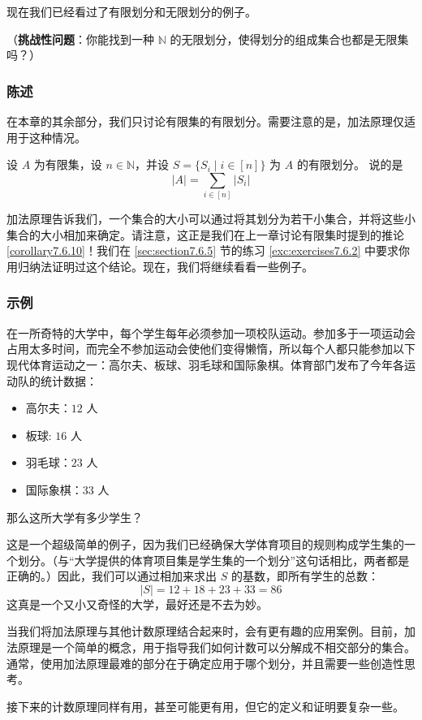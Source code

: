 现在我们已经看过了有限划分和无限划分的例子。

（\textbf{挑战性问题}：你能找到一种 $\mathbb{N}$ 的无限划分，使得划分的组成集合也都是无限集吗？）

\subsubsection*{陈述}

在本章的其余部分，我们只讨论有限集的有限划分。需要注意的是，加法原理仅适用于这种情况。

\begin{proposition}
    设 $A$ 为有限集，设 $n \in \mathbb{N}$，并设 $S = \{S_i \mid i \in [n]\}$ 为 $A$ 的有限划分。 说的是
    \[|A| = \sum_{i \in [n]} |S_i|\]
\end{proposition}

加法原理告诉我们，一个集合的大小可以通过将其划分为若干小集合，并将这些小集合的大小相加来确定。请注意，这正是我们在上一章讨论有限集时提到的推论 \ref{corollary7.6.10}！我们在 \ref{sec:section7.6.5} 节的练习 \ref{exc:exercises7.6.2} 中要求你用归纳法证明过这个结论。现在，我们将继续看看一些例子。

\subsubsection*{示例}

\begin{example}
    在一所奇特的大学中，每个学生每年必须参加一项校队运动。参加多于一项运动会占用太多时间，而完全不参加运动会使他们变得懒惰，所以每个人都只能参加以下现代体育运动之一：高尔夫、板球、羽毛球和国际象棋。体育部门发布了今年各运动队的统计数据：
    \begin{itemize}
        \item 高尔夫：$12$ 人
        \item 板球: $16$ 人
        \item 羽毛球：$23$ 人
        \item 国际象棋：$33$ 人
    \end{itemize}
    那么这所大学有多少学生？

    这是一个超级简单的例子，因为我们已经确保大学体育项目的规则构成学生集的一个划分。（与``大学提供的体育项目集是学生集的一个划分''这句话相比，两者都是正确的。）因此，我们可以通过相加来求出 $S$ 的基数，即所有学生的总数：
    \[|S| = 12 + 18 + 23 + 33 = 86\]
    这真是一个又小又奇怪的大学，最好还是不去为妙。
\end{example}

当我们将加法原理与其他计数原理结合起来时，会有更有趣的应用案例。目前，加法原理是一个简单的概念，用于指导我们如何计数可以分解成不相交部分的集合。通常，使用加法原理最难的部分在于确定应用于哪个划分，并且需要一些创造性思考。

接下来的计数原理同样有用，甚至可能更有用，但它的定义和证明要复杂一些。